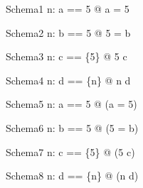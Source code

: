 \documentclass{article}
\begin{document}
\begin{schema}{Schema1}
n: \nat
\where
\LET a == 5 @ a = 5
\end{schema}

\begin{schema}{Schema2}
n: \nat
\where
\LET b == 5 @ 5 = b
\end{schema}

\begin{schema}{Schema3}
n: \nat
\where
\LET c == \{5\} @ 5 \in c
\end{schema}

\begin{schema}{Schema4}
n: \nat
\where
\LET d == \{n\} @ n \in d
\end{schema}

\begin{schema}{Schema5}
n: \nat
\where
\LET a == 5 @ (a = 5)
\end{schema}

\begin{schema}{Schema6}
n: \nat
\where
\LET b == 5 @ (5 = b)
\end{schema}

\begin{schema}{Schema7}
n: \nat
\where
\LET c == \{5\} @ (5 \in c)
\end{schema}

\begin{schema}{Schema8}
n: \nat
\where
\LET d == \{n\} @ (n \in d)
\end{schema}
\end{document}
